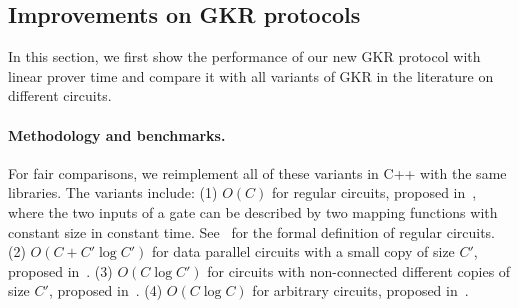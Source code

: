 \subsection{Improvements on GKR protocols}\label{subsec:expGKR}

In this section, we first show the performance of our new GKR protocol with linear prover time and compare it with all variants of GKR in the literature on different circuits.

\paragraph{Methodology and benchmarks.} For fair comparisons, we reimplement all of these variants in C++ with the same libraries. The variants include: (1) $O(C)$ for regular circuits, proposed in~\cite{t13}, where the two inputs of a gate can be described by two mapping functions with constant size in constant time. See~\cite{t13} for the formal definition of regular circuits. (2) $O(C+C'\log C')$ for data parallel circuits with a small copy of size $C'$, proposed in~\cite{wahby2017full}. (3) $O(C\log C')$ for circuits with non-connected different copies of size $C'$, proposed in~\cite{vram}. (4) $O(C\log C)$ for arbitrary circuits, proposed in~\cite{CMT}.


